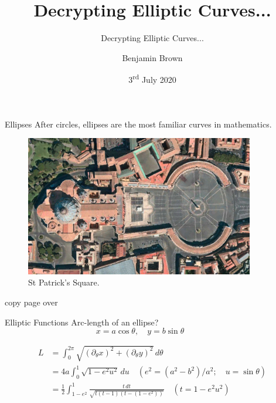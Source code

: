 \documentclass{beamer}
\title[]{Decrypting Elliptic Curves...}
\subtitle{Decrypting Elliptic Curves...}
\author{Benjamin Brown}
\date{3\textsuperscript{rd} July 2020}
\begin{document}

\begin{frame}
  \titlepage
\end{frame}

\begin{frame}[t]{Ellipses}
	After circles, ellipses are the most familiar curves in mathematics.
	\begin{figure}[h]
		\centering
		\includegraphics[width=10cm]{st-patricks-square}
		\caption{St Patrick's Square.}
	\end{figure}
\end{frame}

\begin{frame}	
	copy page over
\end{frame}

\begin{frame}[t]{Elliptic Functions}
	Arc-length of an ellipse?
\begin{equation*}
	x = a\cos\theta,\quad y=b\sin\theta\quad \quad \quad 
\end{equation*}
	
\begin{equation*}
	\begin{split}
		L &= \int_{0}^{2\pi} \sqrt{ ( \partial_{\theta}x )^{2} + ( \partial_{\theta}y )^{2} }\, d\theta \\
		&= 4a \int_{0}^{1} \sqrt{ 1 - e^{2} u^{2} }\, du \quad (e^{2} = (a^{2} - b^{2})/a^{2};\quad u = \sin\theta ) \\
		&= \frac{1}{2} \int_{1-e^{2}}^{1} \frac{t\, dt}{\sqrt{t(t-1)(t - (1-e^{2}))}}\quad (t = 1 - e^{2}u^{2})
	\end{split}
\end{equation*}	
\end{frame}
\end{document}
